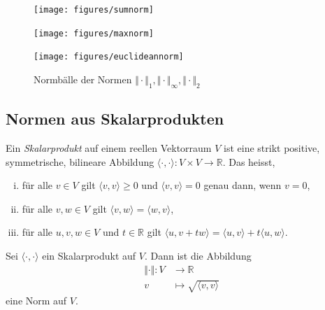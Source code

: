 \documentclass[../main.tex]{subfiles}
\begin{document}
\begin{figure}[htb] 
  \centering
  \begin{minipage}{0.33\textwidth}
    \centering
    \texttt{[image: figures/sumnorm]}
  \end{minipage}%
  \begin{minipage}{0.33\textwidth}
    \centering
    \texttt{[image: figures/maxnorm]}
  \end{minipage}%
  \begin{minipage}{0.33\textwidth}
    \centering
    \texttt{[image: figures/euclideannorm]}
  \end{minipage}%
  \caption{Normbälle der Normen
  $\Vert \cdot \Vert_1,
 \Vert \cdot \Vert_{\infty},
 \Vert \cdot \Vert_2$}%
  \label{fig:norms}
\end{figure}

\subsection*{Normen aus Skalarprodukten}
\begin{definition}
  Ein \emph{Skalarprodukt} auf einem reellen Vektorraum $V$ 
  ist eine strikt positive, symmetrische, bilineare Abbildung
  $\langle \cdot, \cdot \rangle \colon V \times V \to \mathbb{R}$.
  Das heisst,
  \begin{enumerate}[(i)]
    \item für alle $v \in V$ gilt $\langle v, v \rangle \geq 0$ 
      und $\langle v, v \rangle = 0$ genau dann,
      wenn $v = 0$,
    \item für alle $v, w \in V$ gilt 
      $\langle v, w \rangle = \langle w, v \rangle$,
    \item für alle $u, v, w \in V$ und $t \in \mathbb{R}$ gilt
      $\langle u, v + tw \rangle = \langle u, v \rangle + t
      \langle u, w \rangle$.
  \end{enumerate}
\end{definition}

\begin{lemma*}
  Sei $\langle \cdot, \cdot \rangle$ ein Skalarprodukt auf $V$.
  Dann ist die Abbildung
  \begin{align*}
    \Vert \cdot \Vert \colon V & \to \mathbb{R} \\
    v & \mapsto \sqrt{\langle v, v \rangle}
  \end{align*}
  eine Norm auf $V$.
\end{lemma*}
\end{document}
